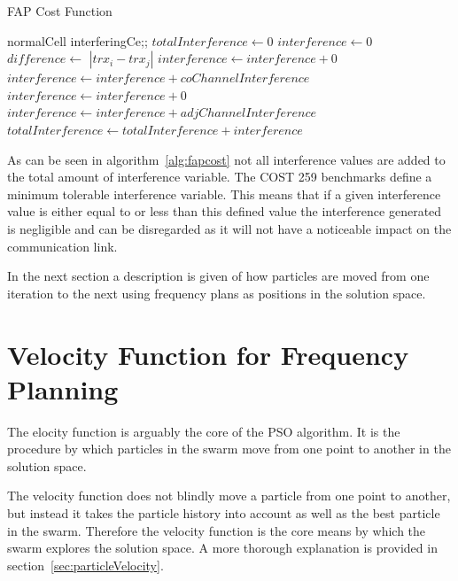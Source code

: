 \begin{algorithm}
\caption{FAP Cost Function}
\label{alg:fapcost}
	\begin{algorithmic}[1]
	\Require normalCell
	\Require interferingCe;;
	\State $totalInterference \leftarrow $0
			\State $interference \leftarrow 0$
			\State $difference \leftarrow$ $|trx_i - trx_j|$
					\State $interference \leftarrow interference + 0$
				\Else
					\State $interference \leftarrow interference + coChannelInterference$
				\EndIf
			\Else
						\State $interference \leftarrow interference + 0$
					\Else
						\State $interference \leftarrow interference + adjChannelInterference$
					\EndIf
				\EndIf
			\EndIf
			\State $totalInterference \leftarrow totalInterference + interference$
		\EndFor
	\EndFor
	\end{algorithmic}
\end{algorithm}

As can be seen in algorithm~\ref{alg:fapcost} not all interference values are added to the total amount of interference variable. The COST 259 benchmarks define a minimum tolerable interference variable. This means that if a given interference value is either equal to or less than this defined value the interference generated is negligible and can be disregarded as it will not have a noticeable impact on the communication link.

In the next section a description is given of how particles are moved from one iteration to the next using frequency plans as positions in the solution space.
\section{Velocity Function for Frequency Planning}
\label{sec:velocityFAP}
The elocity function is arguably the core of the \gls{PSO} algorithm. It is the procedure by which particles in the swarm move from one point to another in the solution space. 

The velocity function does not blindly move a particle from one point to another, but instead it takes the particle history into account as well as the best particle in the swarm. Therefore the velocity function is the core means by which the swarm explores the solution space. A more thorough explanation is provided in section~\ref{sec:particleVelocity}.

